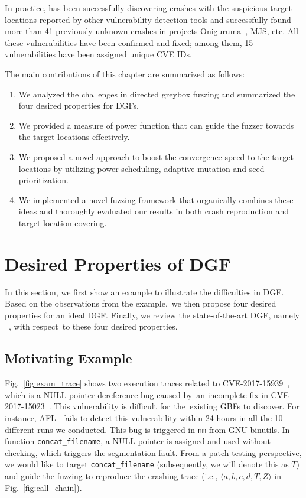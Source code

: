 In practice, \dFOT has been successfully discovering crashes with the suspicious target locations reported by other vulnerability detection tools and successfully found more than 41 previously unknown crashes in projects Oniguruma~\cite{oniguruma}, MJS\cite{mjs}, etc. All these vulnerabilities have been confirmed and fixed; among them, 15 vulnerabilities have been assigned unique CVE IDs.

The main contributions of this chapter are summarized as follows:
\begin{enumerate}[(1)] 
\itemsep0em
\item We analyzed the challenges in directed greybox fuzzing and summarized the four desired properties for DGFs.
\item We provided a measure of power function that can guide the fuzzer towards the target locations effectively.
\item We proposed a novel approach to boost the convergence speed to the target locations by utilizing power scheduling, adaptive mutation and seed prioritization.
\item We implemented a novel fuzzing framework that organically combines these ideas and thoroughly evaluated our results in both crash reproduction and target location covering.
\end{enumerate} 

\section{Desired Properties of DGF}\label{sec:mx}

In this section, we first show an example to illustrate the difficulties in DGF.
Based on the observations from the example,~we then propose four desired properties for an ideal DGF.
Finally, we review the state-of-the-art DGF, namely \aflgo~\cite{Bohme:2017:DGF}, with respect~to these four desired properties. 


\subsection{Motivating Example}\label{subsec:motiv}



Fig.~\ref{fig:exam_trace} shows two execution traces related to CVE-2017-15939~\cite{cve-2017-15939}, which is a NULL pointer dereference bug caused by~an incomplete fix in CVE-2017-15023~\cite{cve-2017-15023}.
This vulnerability is difficult for~the~existing GBFs to discover.
For instance, AFL~\cite{afl} fails to detect this vulnerability within 24 hours in all the 10 different runs we conducted.
This bug is triggered in \texttt{nm} from GNU binutils.
In function \texttt{concat\_filename}, a NULL pointer is assigned and used without checking, which triggers the segmentation fault.
From a patch testing perspective, we would like to target \texttt{concat\_filename} (subsequently, we will denote this as $T$) and guide the fuzzing to reproduce the crashing trace (i.e., $\langle a, b, c, d, T, Z\rangle$ in Fig.~\ref{fig:call_chain}).




